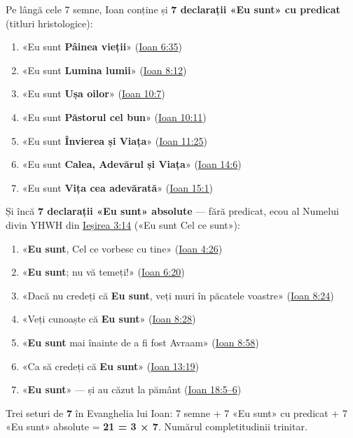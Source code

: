 \documentclass[12pt,a4paper,twoside,openany]{book}
\begin{document}
Pe lângă cele 7 semne, Ioan conține și \textbf{7 declarații «Eu sunt» cu predicat} (titluri hristologice):

\begin{enumerate}
  \item «Eu sunt \textbf{Pâinea vieții}» (\href{https://bibliaortodoxa.ro/carte.php?id=35\&cap=6\#35}{Ioan 6:35})
  \item «Eu sunt \textbf{Lumina lumii}» (\href{https://bibliaortodoxa.ro/carte.php?id=35\&cap=8\#12}{Ioan 8:12})
  \item «Eu sunt \textbf{Ușa oilor}» (\href{https://bibliaortodoxa.ro/carte.php?id=35\&cap=10\#7}{Ioan 10:7})
  \item «Eu sunt \textbf{Păstorul cel bun}» (\href{https://bibliaortodoxa.ro/carte.php?id=35\&cap=10\#11}{Ioan 10:11})
  \item «Eu sunt \textbf{Învierea și Viața}» (\href{https://bibliaortodoxa.ro/carte.php?id=35\&cap=11\#25}{Ioan 11:25})
  \item «Eu sunt \textbf{Calea, Adevărul și Viața}» (\href{https://bibliaortodoxa.ro/carte.php?id=35\&cap=14\#6}{Ioan 14:6})
  \item «Eu sunt \textbf{Vița cea adevărată}» (\href{https://bibliaortodoxa.ro/carte.php?id=35\&cap=15\#1}{Ioan 15:1})
\end{enumerate}
Și încă \textbf{7 declarații «Eu sunt» absolute} — fără predicat, ecou al Numelui divin YHWH din \href{https://bibliaortodoxa.ro/carte.php?id=32\&cap=3\#14}{Ieșirea 3:14} («Eu sunt Cel ce sunt»):

\begin{enumerate}
  \item «\textbf{Eu sunt}, Cel ce vorbesc cu tine» (\href{https://bibliaortodoxa.ro/carte.php?id=35\&cap=4\#26}{Ioan 4:26})
  \item «\textbf{Eu sunt}; nu vă temeți!» (\href{https://bibliaortodoxa.ro/carte.php?id=35\&cap=6\#20}{Ioan 6:20})
  \item «Dacă nu credeți că \textbf{Eu sunt}, veți muri în păcatele voastre» (\href{https://bibliaortodoxa.ro/carte.php?id=35\&cap=8\#24}{Ioan 8:24})
  \item «Veți cunoaște că \textbf{Eu sunt}» (\href{https://bibliaortodoxa.ro/carte.php?id=35\&cap=8\#28}{Ioan 8:28})
  \item «\textbf{Eu sunt} mai înainte de a fi fost Avraam» (\href{https://bibliaortodoxa.ro/carte.php?id=35\&cap=8\#58}{Ioan 8:58})
  \item «Ca să credeți că \textbf{Eu sunt}» (\href{https://bibliaortodoxa.ro/carte.php?id=35\&cap=13\#19}{Ioan 13:19})
  \item «\textbf{Eu sunt}» — și au căzut la pământ (\href{https://bibliaortodoxa.ro/carte.php?id=35\&cap=18\#5}{Ioan 18:5–6})
\end{enumerate}
Trei seturi de \textbf{7} în Evanghelia lui Ioan: 7 semne + 7 «Eu sunt» cu predicat + 7 «Eu sunt» absolute = \textbf{21 = 3 × 7}. Numărul completitudinii trinitar.
\end{document}
